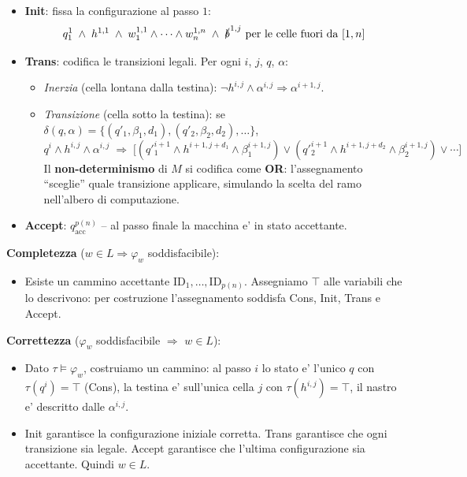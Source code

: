 {\begin{itemize}
    \item \textbf{Init}: fissa la configurazione al passo $1$:
    \[
      q_1^1 \;\wedge\; h^{1,1} \;\wedge\; w_1^{1,1} \wedge \cdots \wedge w_n^{1,n} \;\wedge\; \slashed{b}^{1,j} \text{ per le celle fuori da } [1,n]
    \]

    \item \textbf{Trans}: codifica le transizioni legali. Per ogni $i$, $j$, $q$, $\alpha$:
    \begin{itemize}
      \item \textit{Inerzia} (cella lontana dalla testina): $\neg h^{i,j} \wedge \alpha^{i,j} \Rightarrow \alpha^{i+1,j}$.
      \item \textit{Transizione} (cella sotto la testina): se $\delta(q,\alpha) = \{(q'_1,\beta_1,d_1),(q'_2,\beta_2,d_2),\dots\}$,
      \[
        q^i \wedge h^{i,j} \wedge \alpha^{i,j} \;\Rightarrow\;
        \bigl[(q'^{i+1}_1 \wedge h^{i+1,j+d_1} \wedge \beta_1^{i+1,j}) \vee (q'^{i+1}_2 \wedge h^{i+1,j+d_2} \wedge \beta_2^{i+1,j}) \vee \cdots\bigr]
      \]
      Il \textbf{non-determinismo} di $M$ si codifica come \textbf{OR}: l'assegnamento ``sceglie'' quale transizione applicare, simulando la scelta del ramo nell'albero di computazione.
    \end{itemize}

    \item \textbf{Accept}: $q_{\text{acc}}^{p(n)}$ -- al passo finale la macchina e' in stato accettante.
  \end{itemize}

  \textbf{Completezza} ($w \in L \Rightarrow \varphi_w$ soddisfacibile):
  \begin{itemize}
    \item Esiste un cammino accettante $\text{ID}_1,\dots,\text{ID}_{p(n)}$. Assegniamo $\top$ alle variabili che lo descrivono: per costruzione l'assegnamento soddisfa Cons, Init, Trans e Accept.
  \end{itemize}

  \textbf{Correttezza} ($\varphi_w$ soddisfacibile $\Rightarrow$ $w \in L$):
  \begin{itemize}
    \item Dato $\tau \models \varphi_w$, costruiamo un cammino: al passo $i$ lo stato e' l'unico $q$ con $\tau(q^i) = \top$ (Cons), la testina e' sull'unica cella $j$ con $\tau(h^{i,j}) = \top$, il nastro e' descritto dalle $\alpha^{i,j}$.
    \item Init garantisce la configurazione iniziale corretta. Trans garantisce che ogni transizione sia legale. Accept garantisce che l'ultima configurazione sia accettante. Quindi $w \in L$.
  \end{itemize}

}

